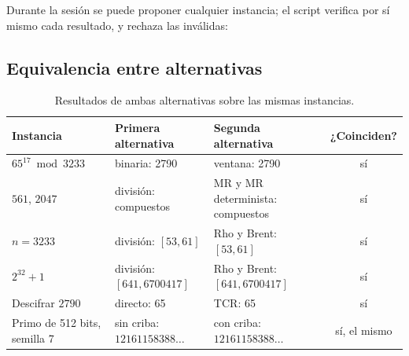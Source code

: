 

Durante la sesión se puede proponer cualquier instancia; el script verifica por
sí mismo cada resultado, y rechaza las inválidas:



\subsection{Equivalencia entre alternativas}



\begin{table}[H]
\centering\small
\caption{Resultados de ambas alternativas sobre las mismas instancias.}
\begin{tabularx}{\linewidth}{@{}l Y Y c@{}}
\toprule
\textbf{Instancia} & \textbf{Primera alternativa} & \textbf{Segunda alternativa} & \textbf{¿Coinciden?}\\
\midrule
$65^{17}\bmod3233$ & binaria: 2790 & ventana: 2790 & sí\\
$561$, $2047$ & división: compuestos & MR y MR determinista: compuestos & sí\\
$n=3233$ & división: $[53, 61]$ & Rho y Brent: $[53, 61]$ & sí\\
$2^{32}+1$ & división: $[641, 6700417]$ & Rho y Brent: $[641, 6700417]$ & sí\\
Descifrar $2790$ & directo: 65 & TCR: 65 & sí\\
Primo de 512 bits, semilla 7 & sin criba: $12161158388\ldots$ & con criba: $12161158388\ldots$ & sí, el mismo\\
\bottomrule
\end{tabularx}
\end{table}

